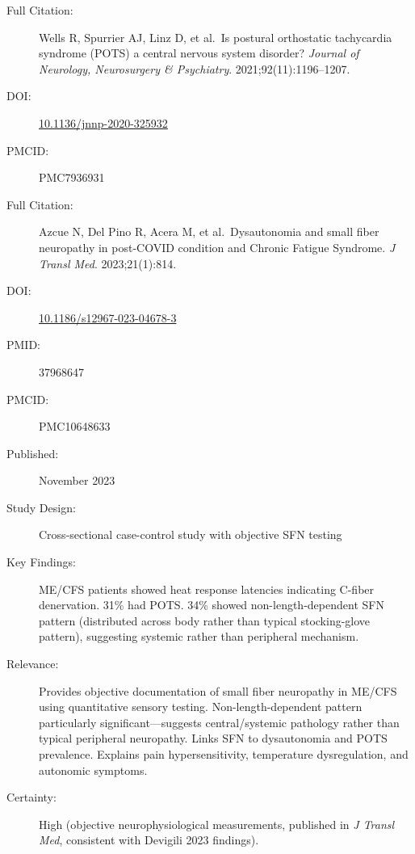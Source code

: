 \begin{description}
    \item[Full Citation:] Wells R, Spurrier AJ, Linz D, et al.\ Is postural orthostatic tachycardia syndrome (POTS) a central nervous system disorder? \textit{Journal of Neurology, Neurosurgery \& Psychiatry}. 2021;92(11):1196--1207.
    \item[DOI:] \href{https://doi.org/10.1136/jnnp-2020-325932}{10.1136/jnnp-2020-325932}
    \item[PMCID:] PMC7936931
\end{description}

\begin{description}
    \item[Full Citation:] Azcue N, Del Pino R, Acera M, et al.\ Dysautonomia and small fiber neuropathy in post-COVID condition and Chronic Fatigue Syndrome. \textit{J Transl Med}. 2023;21(1):814.
    \item[DOI:] \href{https://doi.org/10.1186/s12967-023-04678-3}{10.1186/s12967-023-04678-3}
    \item[PMID:] 37968647
    \item[PMCID:] PMC10648633
    \item[Published:] November 2023
    \item[Study Design:] Cross-sectional case-control study with objective SFN testing
    \item[Key Findings:] ME/CFS patients showed heat response latencies indicating C-fiber denervation. 31\% had POTS. 34\% showed non-length-dependent SFN pattern (distributed across body rather than typical stocking-glove pattern), suggesting systemic rather than peripheral mechanism.
    \item[Relevance:] Provides objective documentation of small fiber neuropathy in ME/CFS using quantitative sensory testing. Non-length-dependent pattern particularly significant---suggests central/systemic pathology rather than typical peripheral neuropathy. Links SFN to dysautonomia and POTS prevalence. Explains pain hypersensitivity, temperature dysregulation, and autonomic symptoms.
    \item[Certainty:] High (objective neurophysiological measurements, published in \textit{J Transl Med}, consistent with Devigili 2023 findings).
\end{description}

